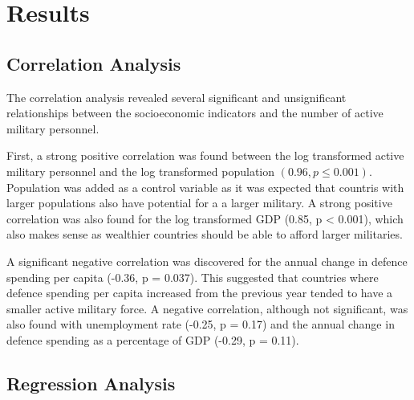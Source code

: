 \chapter{Results}

\section{Correlation Analysis}

The correlation analysis revealed several significant and unsignificant relationships 
between the socioeconomic indicators and the number of active military personnel.

First, a strong positive correlation was found between the log transformed 
active military personnel and the log transformed population $(0.96, p \leq 0.001)$.
Population was added as a control variable as it was expected that countris with 
larger populations also have potential for a a larger military. 
A strong positive correlation was 
also found for the log transformed GDP (0.85, p < 0.001), which also makes sense 
as wealthier countries should be able to afford larger militaries.

A significant negative correlation was discovered for the annual change in defence 
spending per capita (-0.36, p = 0.037). This suggested that countries where defence spending 
per capita increased from the previous year tended to have a smaller active military force.
A negative correlation, although not significant, was also found with unemployment rate 
(-0.25, p = 0.17) and the annual change in defence spending as a percentage of GDP 
(-0.29, p = 0.11).


\section{Regression Analysis}